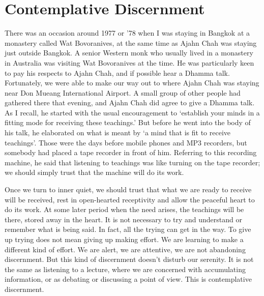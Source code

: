 \section{Contemplative Discernment}

There was an occasion around 1977 or '78 when I was staying in Bangkok
at a monastery called Wat Bovoranives, at the same time as Ajahn Chah
was staying just outside Bangkok. A senior Western monk who usually
lived in a monastery in Australia was visiting Wat Bovoranives at the
time. He was particularly keen to pay his respects to Ajahn Chah, and if
possible hear a Dhamma talk. Fortunately, we were able to make our way
out to where Ajahn Chah was staying near Don Mueang International
Airport. A small group of other people had gathered there that evening,
and Ajahn Chah did agree to give a Dhamma talk. As I recall, he started
with the usual encouragement to ‘establish your minds in a fitting mode
for receiving these teachings.’ But before he went into the body of his
talk, he elaborated on what is meant by ‘a mind that is fit to receive
teachings’. Those were the days before mobile phones and MP3 recorders,
but somebody had placed a tape recorder in front of him. Referring to
this recording machine, he said that listening to teachings was like
turning on the tape recorder; we should simply trust that the machine
will do its work.

Once we turn to inner quiet, we should trust that what we are ready to
receive will be received, rest in open-hearted receptivity and allow the
peaceful heart to do its work. At some later period when the need
arises, the teachings will be there, stored away in the heart. It is not
necessary to try and understand or remember what is being said. In fact,
all the trying can get in the way. To give up trying does not mean
giving up making effort. We are learning to make a different kind of
effort. We are alert, we are attentive, we are not abandoning
discernment. But this kind of discernment doesn’t disturb our serenity.
It is not the same as listening to a lecture, where we are concerned
with accumulating information, or as debating or discussing a point of
view. This is contemplative discernment.

\enlargethispage*{\baselineskip}

